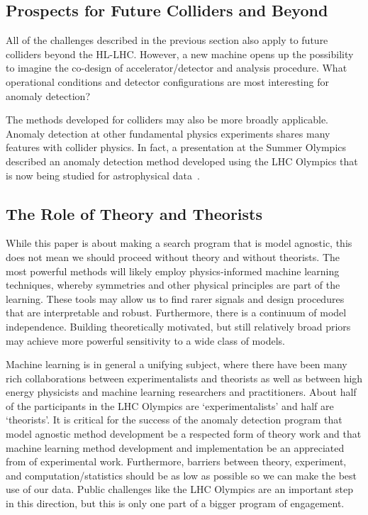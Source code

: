 \documentclass[a4paper,11pt]{article}
\begin{document}
\subsection{Prospects for Future Colliders and Beyond}

All of the challenges described in the previous section also apply to future colliders beyond the HL-LHC.  However, a new machine opens up the possibility to imagine the co-design of accelerator/detector and analysis procedure.  What operational conditions and detector configurations are most interesting for anomaly detection?  

The methods developed for colliders may also be more broadly applicable.  Anomaly detection at other fundamental physics experiments shares many features with collider physics.  In fact, a presentation at the Summer Olympics described an anomaly detection method developed using the LHC Olympics that is now being studied for astrophysical data~\cite{streams}.

\subsection{The Role of Theory and Theorists}

While this paper is about making a search program that is model agnostic, this does not mean we should proceed without theory and without theorists.  The most powerful methods will likely employ physics-informed machine learning techniques, whereby symmetries and other physical principles are part of the learning.  These tools may allow us to find rarer signals and design procedures that are interpretable and robust.  Furthermore, there is a continuum of model independence.  Building theoretically motivated, but still relatively broad priors may achieve more powerful sensitivity to a wide class of models.

Machine learning is in general a unifying subject, where there have been many rich collaborations between experimentalists and theorists as well as between high energy physicists and machine learning researchers and practitioners.  About half of the participants in the LHC Olympics are `experimentalists' and half are `theorists'.  It is critical for the success of the anomaly detection program that model agnostic method development be a respected form of theory work and that machine learning method development and implementation be an appreciated from of experimental work.  Furthermore, barriers between theory, experiment, and computation/statistics should be as low as possible so we can make the best use of our data.  Public challenges like the LHC Olympics are an important step in this direction, but this is only one part of a bigger program of engagement.
\end{document}
